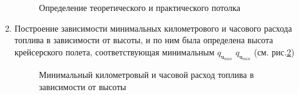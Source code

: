 \begin{enumerate}
\begin{figure}[H]
    \caption{Определение теоретического и практического потолка}
    \label{fig:Vy_min}
\end{figure}

\item Построение зависимости минимальных километрового и часового расхода
топлива в зависимости от высоты, и по ним была определена высота
крейсерского полета, соответствующая минимальным $q_{\text{ч}_{min}}$ $q_{\text{ч}_{min}}$ (см.
рис.\ref{fig:qhqkmMIN}) 

\begin{figure}[H]
    \caption{Минимальный километровый и часовой расход топлива в зависимости
от высоты}
    \label{fig:qhqkmMIN}
\end{figure}

\end{enumerate}

